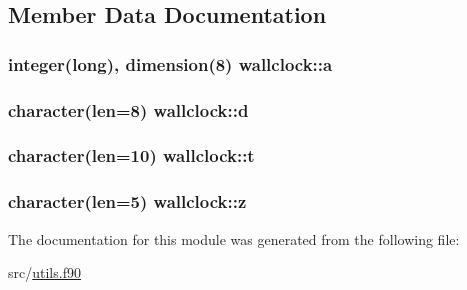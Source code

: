 \subsection{Member Data Documentation}
\hypertarget{classwallclock_a634d56ca30b98ea804c6d33a0a635ec0}{
\subsubsection[{a}]{\setlength{\rightskip}{0pt plus 5cm}integer(long), dimension(8) wallclock\+::a\hspace{0.3cm}{\ttfamily [private]}}}\label{classwallclock_a634d56ca30b98ea804c6d33a0a635ec0}
\hypertarget{classwallclock_a0922e57a4f1a99af864f31246c132d4c}{
\subsubsection[{d}]{\setlength{\rightskip}{0pt plus 5cm}character(len=8) wallclock\+::d\hspace{0.3cm}{\ttfamily [private]}}}\label{classwallclock_a0922e57a4f1a99af864f31246c132d4c}
\hypertarget{classwallclock_a8a94eeecb39db73f1c36c9b00a95c9f7}{
\subsubsection[{t}]{\setlength{\rightskip}{0pt plus 5cm}character(len=10) wallclock\+::t\hspace{0.3cm}{\ttfamily [private]}}}\label{classwallclock_a8a94eeecb39db73f1c36c9b00a95c9f7}
\hypertarget{classwallclock_a47a8e5d4efccd0142b0587c873dad88b}{
\subsubsection[{z}]{\setlength{\rightskip}{0pt plus 5cm}character(len=5) wallclock\+::z\hspace{0.3cm}{\ttfamily [private]}}}\label{classwallclock_a47a8e5d4efccd0142b0587c873dad88b}


The documentation for this module was generated from the following file\+:\begin{DoxyCompactItemize}
\item 
src/\hyperlink{utils_8f90}{utils.\+f90}\end{DoxyCompactItemize}
